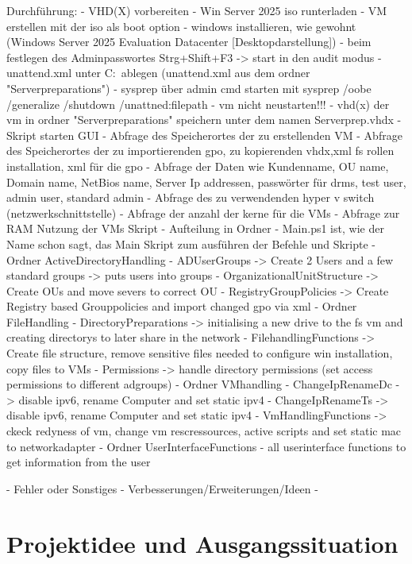 \documentclass[conference]{IEEEtran}
\begin{document}
Durchführung:
- VHD(X) vorbereiten
    - Win Server 2025 iso runterladen
    - VM erstellen mit der iso als boot option
    - windows installieren, wie gewohnt (Windows Server 2025 Evaluation Datacenter [Desktopdarstellung])
    - beim festlegen des Adminpasswortes Strg+Shift+F3 -> start in den audit modus
    - unattend.xml unter C:\ ablegen (unattend.xml aus dem ordner "Serverpreparations")
    - sysprep über admin cmd starten mit sysprep /oobe /generalize /shutdown /unattned:filepath
    - vm nicht neustarten!!!
    - vhd(x) der vm in ordner "Serverpreparations" speichern unter dem namen Serverprep.vhdx
- Skript starten
    GUI
    - Abfrage des Speicherortes der zu erstellenden VM
    - Abfrage des Speicherortes der zu importierenden gpo, zu kopierenden vhdx,xml fs rollen installation, xml für die gpo
    - Abfrage der Daten wie Kundenname, OU name, Domain name, NetBios name, Server Ip addressen, passwörter für drms, test user, admin user, standard admin
    - Abfrage des zu verwendenden hyper v switch (netzwerkschnittstelle) 
    - Abfrage der anzahl der kerne für die VMs
    - Abfrage zur RAM Nutzung der VMs
    Skript
        - Aufteilung in Ordner 
        - Main.ps1 ist, wie der Name schon sagt, das Main Skript zum ausführen der Befehle und Skripte 
    - Ordner ActiveDirectoryHandling
        - ADUserGroups -> Create 2 Users and a few standard groups -> puts users into groups
        - OrganizationalUnitStructure -> Create OUs and move severs to correct OU
        - RegistryGroupPolicies -> Create Registry based Grouppolicies and import changed gpo via xml
    - Ordner FileHandling
        - DirectoryPreparations -> initialising a new drive to the fs vm and creating directorys to later share in the network
        - FilehandlingFunctions -> Create file structure, remove sensitive files needed to configure win installation, copy files to VMs
        - Permissions -> handle directory permissions (set access permissions to different adgroups)
    - Ordner VMhandling
        - ChangeIpRenameDc -> disable ipv6, rename Computer and set static ipv4
        - ChangeIpRenameTs -> disable ipv6, rename Computer and set static ipv4
        - VmHandlingFunctions -> ckeck redyness of vm, change vm rescressources, active scripts and set static mac to networkadapter 
    - Ordner UserInterfaceFunctions
        - all userinterface functions to get information from the user
    
- Fehler oder Sonstiges
- Verbesserungen/Erweiterungen/Ideen
    - 

\section{Projektidee und Ausgangssituation}
\end{document}
